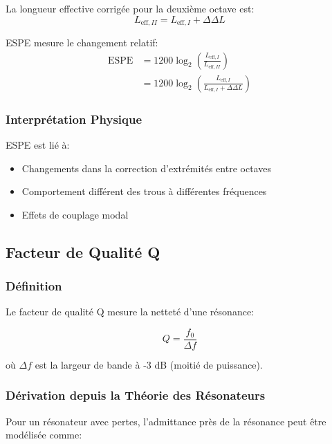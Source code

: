 \documentclass[12pt,a4paper,twocolumn]{article}
\newcommand{\freqzero}{f_0}
\begin{document}
La longueur effective corrigée pour la deuxième octave est:
\begin{equation}
L_{\text{eff},II} = L_{\text{eff},I} + \Delta\Delta L
\label{eq:longueur_effective_II}
\end{equation}

ESPE mesure le changement relatif:
\begin{align}
\text{ESPE} &= 1200 \log_2\left(\frac{L_{\text{eff},I}}{L_{\text{eff},II}}\right) \\
&= 1200 \log_2\left(\frac{L_{\text{eff},I}}{L_{\text{eff},I} + \Delta\Delta L}\right)
\label{eq:espe_deriv}
\end{align}

\subsubsection{Interprétation Physique}

ESPE est lié à:
\begin{itemize}
    \item Changements dans la correction d'extrémités entre octaves
    \item Comportement différent des trous à différentes fréquences
    \item Effets de couplage modal
\end{itemize}

\subsection{Facteur de Qualité Q}

\subsubsection{Définition}

Le facteur de qualité Q mesure la netteté d'une résonance:

\begin{equation}
Q = \frac{\freqzero}{\Delta f}
\label{eq:q_factor}
\end{equation}

où $\Delta f$ est la largeur de bande à -3 dB (moitié de puissance).

\subsubsection{Dérivation depuis la Théorie des Résonateurs}

Pour un résonateur avec pertes, l'admittance près de la résonance peut être modélisée comme:
\end{document}
